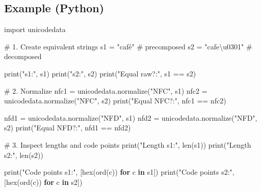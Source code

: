 \documentclass[
  letterpaper,
  DIV=11,
  numbers=noendperiod]{scrreprt}
\newenvironment{Shaded}{\begin{snugshade}}{\end{snugshade}}
\newcommand{\BuiltInTok}[1]{\textcolor[rgb]{0.00,0.23,0.31}{#1}}
\newcommand{\CharTok}[1]{\textcolor[rgb]{0.13,0.47,0.30}{#1}}
\newcommand{\CommentTok}[1]{\textcolor[rgb]{0.37,0.37,0.37}{#1}}
\newcommand{\ControlFlowTok}[1]{\textcolor[rgb]{0.00,0.23,0.31}{\textbf{#1}}}
\newcommand{\ImportTok}[1]{\textcolor[rgb]{0.00,0.46,0.62}{#1}}
\newcommand{\KeywordTok}[1]{\textcolor[rgb]{0.00,0.23,0.31}{\textbf{#1}}}
\newcommand{\NormalTok}[1]{\textcolor[rgb]{0.00,0.23,0.31}{#1}}
\newcommand{\OperatorTok}[1]{\textcolor[rgb]{0.37,0.37,0.37}{#1}}
\newcommand{\StringTok}[1]{\textcolor[rgb]{0.13,0.47,0.30}{#1}}
\begin{document}
\subsection{Example (Python)}\label{example-python-6}

\begin{Shaded}
\begin{Highlighting}[]
\ImportTok{import}\NormalTok{ unicodedata}

\CommentTok{\# 1. Create equivalent strings}
\NormalTok{s1 }\OperatorTok{=} \StringTok{"café"}           \CommentTok{\# precomposed}
\NormalTok{s2 }\OperatorTok{=} \StringTok{"cafe}\CharTok{\textbackslash{}u0301}\StringTok{"}     \CommentTok{\# decomposed}

\BuiltInTok{print}\NormalTok{(}\StringTok{"s1:"}\NormalTok{, s1)}
\BuiltInTok{print}\NormalTok{(}\StringTok{"s2:"}\NormalTok{, s2)}
\BuiltInTok{print}\NormalTok{(}\StringTok{"Equal raw?:"}\NormalTok{, s1 }\OperatorTok{==}\NormalTok{ s2)}

\CommentTok{\# 2. Normalize}
\NormalTok{nfc1 }\OperatorTok{=}\NormalTok{ unicodedata.normalize(}\StringTok{"NFC"}\NormalTok{, s1)}
\NormalTok{nfc2 }\OperatorTok{=}\NormalTok{ unicodedata.normalize(}\StringTok{"NFC"}\NormalTok{, s2)}
\BuiltInTok{print}\NormalTok{(}\StringTok{"Equal NFC?:"}\NormalTok{, nfc1 }\OperatorTok{==}\NormalTok{ nfc2)}

\NormalTok{nfd1 }\OperatorTok{=}\NormalTok{ unicodedata.normalize(}\StringTok{"NFD"}\NormalTok{, s1)}
\NormalTok{nfd2 }\OperatorTok{=}\NormalTok{ unicodedata.normalize(}\StringTok{"NFD"}\NormalTok{, s2)}
\BuiltInTok{print}\NormalTok{(}\StringTok{"Equal NFD?:"}\NormalTok{, nfd1 }\OperatorTok{==}\NormalTok{ nfd2)}

\CommentTok{\# 3. Inspect lengths and code points}
\BuiltInTok{print}\NormalTok{(}\StringTok{"Length s1:"}\NormalTok{, }\BuiltInTok{len}\NormalTok{(s1))}
\BuiltInTok{print}\NormalTok{(}\StringTok{"Length s2:"}\NormalTok{, }\BuiltInTok{len}\NormalTok{(s2))}

\BuiltInTok{print}\NormalTok{(}\StringTok{"Code points s1:"}\NormalTok{, [}\BuiltInTok{hex}\NormalTok{(}\BuiltInTok{ord}\NormalTok{(c)) }\ControlFlowTok{for}\NormalTok{ c }\KeywordTok{in}\NormalTok{ s1])}
\BuiltInTok{print}\NormalTok{(}\StringTok{"Code points s2:"}\NormalTok{, [}\BuiltInTok{hex}\NormalTok{(}\BuiltInTok{ord}\NormalTok{(c)) }\ControlFlowTok{for}\NormalTok{ c }\KeywordTok{in}\NormalTok{ s2])}
\end{Highlighting}
\end{Shaded}
\end{document}
